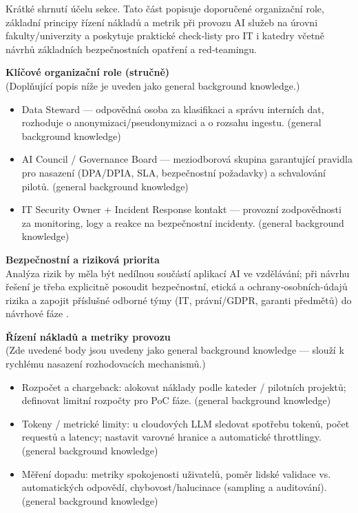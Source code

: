 
Krátké shrnutí účelu sekce. Tato část popisuje doporučené organizační role, základní principy řízení nákladů a metrik při provozu AI služeb na úrovni fakulty/univerzity a poskytuje praktické check‑listy pro IT i katedry včetně návrhů základních bezpečnostních opatření a red‑teamingu.

\medskip

\textbf{Klíčové organizační role (stručně)} \\
(Doplňující popis níže je uveden jako general background knowledge.)
\begin{itemize}
  \item Data Steward — odpovědná osoba za klasifikaci a správu interních dat, rozhoduje o anonymizaci/pseudonymizaci a o rozsahu ingestu. (general background knowledge)
  \item AI Council / Governance Board — meziodborová skupina garantující pravidla pro nasazení (DPA/DPIA, SLA, bezpečnostní požadavky) a schvalování pilotů. (general background knowledge)
  \item IT Security Owner + Incident Response kontakt — provozní zodpovědnosti za monitoring, logy a reakce na bezpečnostní incidenty. (general background knowledge)
\end{itemize}

\medskip

\textbf{Bezpečnostní a riziková priorita} \\
Analýza rizik by měla být nedílnou součástí aplikací AI ve vzdělávání; při návrhu řešení je třeba explicitně posoudit bezpečnostní, etická a ochrany‑osobních‑údajů rizika a zapojit příslušné odborné týmy (IT, právní/GDPR, garanti předmětů) do návrhové fáze \cite{kb_malinka_chatgpt_ve_vyuce_dva_roky_pote_2024_pdf_90bc3aaf_page_12_1}. 

\medskip

\textbf{Řízení nákladů a metriky provozu} \\
(Zde uvedené body jsou uvedeny jako general background knowledge — slouží k rychlému nasazení rozhodovacích mechanismů.)
\begin{itemize}
  \item Rozpočet a chargeback: alokovat náklady podle kateder / pilotních projektů; definovat limitní rozpočty pro PoC fáze. (general background knowledge)
  \item Tokeny / metrické limity: u cloudových LLM sledovat spotřebu tokenů, počet requestů a latency; nastavit varovné hranice a automatické throttlingy. (general background knowledge)
  \item Měření dopadu: metriky spokojenosti uživatelů, poměr lidské validace vs. automatických odpovědí, chybovost/halucinace (sampling a auditování). (general background knowledge)
\end{itemize}

